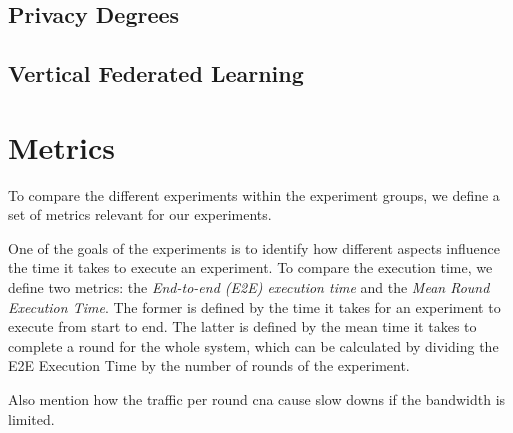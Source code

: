 \todo{}

\subsection{Privacy Degrees}

\todo{}

\subsection{Vertical Federated Learning}

\todo{}

\section{Metrics}

To compare the different experiments within the experiment groups, we define a set of metrics relevant for our experiments.

One of the goals of the experiments is to identify how different aspects influence the time it takes to execute an experiment. To compare the execution time, we define two metrics: the \textit{End-to-end (E2E) execution time} and the \textit{Mean Round Execution Time}. The former is defined by the time it takes for an experiment to execute from start to end. The latter is defined by the mean time it takes to complete a round for the whole system, which can be calculated by dividing the E2E Execution Time by the number of rounds of the experiment.



 Also mention how the traffic per round cna cause slow downs if the bandwidth is limited.


